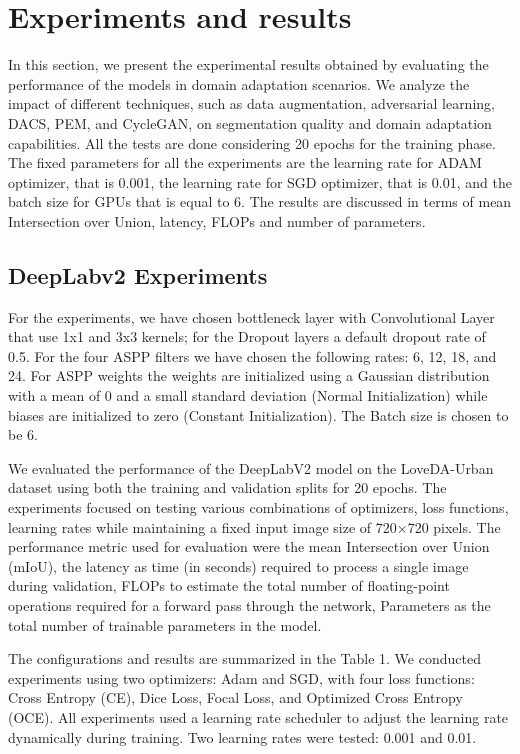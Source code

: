 \documentclass[10pt,twocolumn,letterpaper]{article}
\begin{document}
\noindent

\section{Experiments and results}
\label{sec:experiments}

In this section, we present the experimental results obtained by evaluating the performance of the models in domain adaptation scenarios. We analyze the impact of different techniques, such as data augmentation, adversarial learning, DACS, PEM, and CycleGAN, on segmentation quality and domain adaptation capabilities. All the tests are done considering 20 epochs for the training phase. The fixed parameters for all the experiments are the learning rate for ADAM optimizer, that is 0.001, the learning rate for SGD optimizer, that is 0.01, and the batch size for GPUs that is equal to 6.  The results are discussed in terms of mean Intersection over Union, latency, FLOPs and number of parameters. 

\subsection{DeepLabv2 Experiments}
For the experiments, we have chosen bottleneck layer with Convolutional Layer that use 1x1 and 3x3 kernels; for the Dropout layers a default dropout rate of 0.5. For the four ASPP filters we have chosen the following rates: 6, 12, 18, and 24. For ASPP weights the weights are initialized using a Gaussian distribution with a mean of 0 and a small standard deviation (Normal Initialization) while biases are initialized to zero (Constant Initialization). The Batch size is chosen to be 6.

We evaluated the performance of the DeepLabV2 model on the LoveDA-Urban dataset using both the training and validation splits for 20 epochs. The experiments focused on testing various combinations of optimizers, loss functions, learning rates while maintaining a fixed input image size of 720×720 pixels. The performance metric used for evaluation were the mean Intersection over Union (mIoU), the latency as time (in seconds) required to process a single image during validation, FLOPs to estimate the total number of floating-point operations required for a forward pass through the network, Parameters as the total number of trainable parameters in the model.

The configurations and results are summarized in the Table 1. We conducted experiments using two optimizers: Adam and SGD, with four loss functions: Cross Entropy (CE), Dice Loss, Focal Loss, and Optimized Cross Entropy (OCE). All experiments used a learning rate scheduler to adjust the learning rate dynamically during training. Two learning rates were tested: 0.001 and 0.01.
\end{document}
